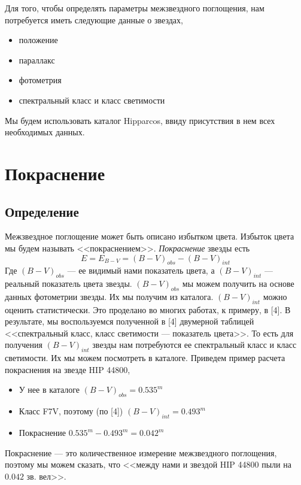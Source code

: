 \documentclass[14pt]{article}
\begin{document}
        Для того, чтобы определять параметры межзвездного поглощения, нам потребуется иметь следующие данные о звездах,  
        \begin{itemize}
            \item положение
            \item параллакс 
            \item фотометрия 
            \item спектральный класс и класс светимости
        \end{itemize}
        Мы будем использовать каталог Hipparcos, ввиду присутствия в нем всех необходимых данных. 
    
    
    \section{Покраснение}
    
    
        \subsection{Определение}
            Межзвездное поглощение может быть описано избытком цвета. Избыток цвета мы будем называть <<покраснением>>. {\it Покраснение} звезды есть
                $$
                    E = E_{B - V} = (B - V)_{obs} - (B - V)_{int}    
                $$ 
            Где $(B - V)_{obs}$ --- ее видимый нами показатель цвета, а $(B - V)_{int}$ --- реальный показатель цвета звезды. $(B - V)_{obs}$ мы можем получить на основе данных фотометрии звезды. Их мы получим из каталога. $(B - V)_{int}$ можно оценить статистически. Это проделано во многих работах, к примеру, в [4]. В результате, мы воспользуемся полученной в [4] двумерной таблицей <<спектральный класс, класс светимости --- показатель цвета>>. То есть для получения $(B - V)_{int}$ звезды нам потребуются ее спектральный класс и класс светимости. Их мы можем посмотреть в каталоге. Приведем пример расчета покраснения на звезде HIP 44800,
                \begin{itemize}
                    \item У нее в каталоге $(B - V)_{obs} = 0.535^m$
                    \item Класс F7V, поэтому (по [4]) $(B - V)_{int} = 0.493^m$
                    \item Покраснение $0.535^m - 0.493^m = 0.042^m$
                \end{itemize}
                Покраснение --- это количественное измерение межзвездного поглощения, поэтому мы можем сказать, что <<между нами и звездой HIP 44800 пыли на $0.042$ зв. вел>>.
        
\end{document}
